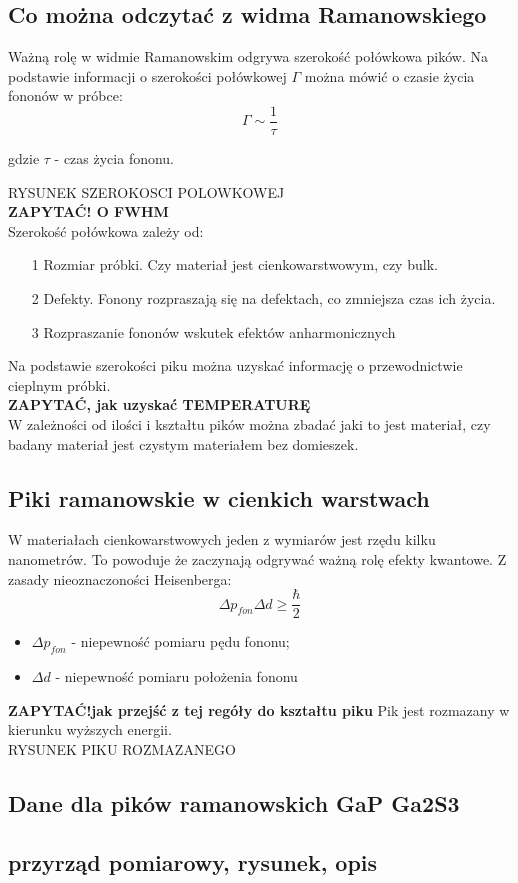 \subsection{Co można odczytać z widma Ramanowskiego}
Ważną rolę w widmie Ramanowskim odgrywa szerokość połówkowa pików.
Na podstawie informacji o szerokości połówkowej $\Gamma$ można mówić o czasie życia fononów w próbce:
\begin{equation}
	\Gamma \sim \frac{1}{\tau}
\end{equation}

gdzie $\tau$ - czas życia fononu.

RYSUNEK SZEROKOSCI POLOWKOWEJ 
\\
\textbf{ZAPYTAĆ! O FWHM}
\\
Szerokość połówkowa zależy od:
\begin{itemize}
	\item[1]{Rozmiar próbki. Czy materiał jest cienkowarstwowym, czy bulk.}
	\item[2]{Defekty. Fonony rozpraszają się na defektach, co zmniejsza czas ich życia.}
	\item[3]{Rozpraszanie fononów wskutek efektów anharmonicznych}
\end{itemize}
Na podstawie szerokości piku można uzyskać informację o przewodnictwie cieplnym próbki. 
\\
\textbf{ZAPYTAĆ, jak uzyskać TEMPERATURĘ} 
\\
W zależności od ilości i kształtu pików można zbadać jaki to jest materiał, czy badany materiał jest czystym materiałem bez domieszek.

\subsection{Piki ramanowskie w cienkich warstwach}
W materiałach cienkowarstwowych jeden z wymiarów jest rzędu kilku nanometrów. To powoduje że zaczynają odgrywać ważną rolę efekty kwantowe. Z zasady nieoznaczoności Heisenberga:
\begin{equation}
	\Delta p_{fon} \Delta d \geq \frac{\hbar}{2}
\end{equation}
\begin{itemize}
	\item{$\Delta p_{fon}$ - niepewność pomiaru pędu fononu};
	\item{$\Delta d$ - niepewność pomiaru położenia fononu}
\end{itemize}
\textbf{ZAPYTAĆ!jak przejść z tej regóły do kształtu piku}
Pik jest rozmazany w kierunku wyższych energii.
\\
RYSUNEK PIKU ROZMAZANEGO
\\



\subsection{Dane dla pików ramanowskich GaP Ga2S3}

\subsection{przyrząd pomiarowy, rysunek, opis}
